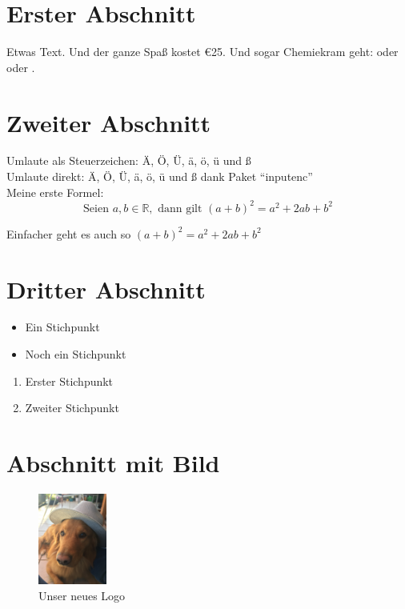 \documentclass[12pt,twoside,a4paper]{article}
\begin{document}

\section{Erster Abschnitt}
Etwas Text. Und der ganze Spaß kostet \euro{25}. Und sogar Chemiekram geht:  oder  oder .


\section{Zweiter Abschnitt}
Umlaute als Steuerzeichen: \"A, \"O, \"U, \"a, \"o, \"u und \ss{} \\
Umlaute direkt: Ä, Ö, Ü, ä, ö, ü und ß dank Paket "`inputenc"'\\

Meine erste Formel:
\begin{equation}
\text{Seien } a,b \in \mathbb{R}, \text{ dann gilt } (a+b)^{2} = a^{2} + 2ab + b^{2}
\end{equation}

Einfacher geht es auch so $(a+b)^{2} = a^{2} + 2ab + b^{2}$

\section{Dritter Abschnitt}

\begin{itemize} 
\item Ein Stichpunkt 
\item Noch ein Stichpunkt 
\end{itemize}

\begin{enumerate} 
\item Erster Stichpunkt
\item Zweiter Stichpunkt 
\end{enumerate}

\section{Abschnitt mit Bild}

\begin{figure}[htbp]
\centering
\includegraphics[width=0.2\textwidth]{Knut}
\caption{Unser neues Logo}
\label{fig:Bild1}
\end{figure}
\end{document}
